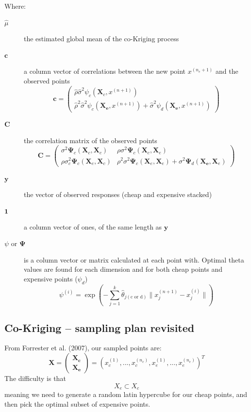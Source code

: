 \documentclass[11pt]{article}
\newcommand{\subentry}[1]{\subsection{#1}}
\theoremstyle{definition}
\begin{document}
Where:
\begin{description}
  \item[$\hat{\mu}$] the estimated global mean of the co-Kriging process
  \item[$\mathbf{c}$] a column vector of correlations between the new point $x^{(n_e+1)}$ and the observed points
  $$\mathbf{c} = 
  \begin{pmatrix} 
    \hat{\rho}\hat{\sigma}^2\psi_c(\mathbf{X}_c,x^{(n+1)}) \\ 
    \hat{\rho}^2\hat{\sigma}^2\psi_c(\mathbf{X_e},x^{(n+1)}) + \hat{\sigma}^2\psi_d(\mathbf{X_e},x^{(n+1)})
  \end{pmatrix}$$
  \item[$\mathbf{C}$] the correlation matrix of the observed points
  $$\mathbf{C} = 
  \begin{pmatrix} 
    \sigma^2\mathbf{\Psi}_c(\mathbf{X}_c,\mathbf{X}_c) &\rho\sigma^2\mathbf{\Psi}_c(\mathbf{X}_c,\mathbf{X}_e) \\ 
    \rho\sigma_c^2\mathbf{\Psi}_c(\mathbf{X}_e,\mathbf{X}_c) & \rho^2\sigma^2\mathbf{\Psi}_c(\mathbf{X}_e,\mathbf{X}_e) + \sigma^2\mathbf{\Psi}_d(\mathbf{X_e},\mathbf{X}_e)
  \end{pmatrix}$$
  \item[$\mathbf{y}$] the vector of observed responses (cheap and expensive stacked)
  \item[$\mathbf{1}$] a column vector of ones, of the same length as $\mathbf{y}$
  \item[$\psi$ or $\mathbf{\Psi}$] is a column vector or matrix calculated at each point with. Optimal theta values are found 
  for each dimension and for both cheap points and expensive points ($\psi_d$)
    $$\psi^{(i)} = \exp{(-\sum_{j=1}^{k}\hat{\theta}_{j(\text{c or d})}\|x_j^{(n+1)} - x_j^{(i)}\|)}$$
\end{description}

\subentry{Co-Kriging -- sampling plan revisited}
From Forrester et al. (2007), our sampled points are:
\begin{equation}
  \mathbf{X} = \begin{pmatrix} \mathbf{X_c} \\ \mathbf{X_e} \end{pmatrix} = (x_c^{(1)},...,x_c^{(n_c)},x_e^{(1)},...,x_e^{(n_e)})^T
  \label{eq:co-kriging-sampling}
\end{equation}
The difficulty is that $$X_e \subset X_c$$
meaning we need to generate a random latin hypercube for our cheap points, and then pick the optimal subset of expensive points.
\end{document}
